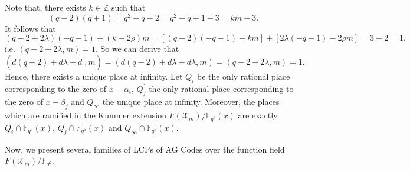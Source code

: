 \documentclass[journal,12pt,onecolumn]{IEEEtran}
\begin{document}
Note that, there exists $k\in\mathbb{Z}$ such that
\[
    (q-2)(q+1) = q^2-q-2 = q^2-q+1 -3 = km -3. 
\]
It follows that
\[
    (q-2+2\lambda)(-q-1) + (k-2\rho)m = [(q-2)(-q-1)+km] + [2\lambda(-q-1)-2\rho m] = 3-2 =1,
\]
i.e. $(q-2+2\lambda,m)=1$. So we can derive that 
\[
    (d(q-2)+d\lambda+d^\prime,m)=(d(q-2)+d\lambda+d\lambda,m) = (q-2+2\lambda,m)=1.
\]
Hence, there exists a unique place at infinity. Let $Q_i$ be the only rational place corresponding to the zero of $x-\alpha_i$, $Q_j^\prime$ the only rational place corresponding to the zero of $x-\beta_j$ and $Q_\infty$ the unique place at infinity. Moreover, the places which are ramified in the Kummer extension $F(\mathcal{X}_m)/\mathbb{F}_{q^6}(x)$ are exactly $Q_i\cap\mathbb{F}_{q^6}(x)$, $Q_j^\prime\cap\mathbb{F}_{q^6}(x)$ and $Q_\infty\cap\mathbb{F}_{q^6}(x)$. 

Now, we present several families of LCPs of AG Codes over the function field $F(\mathcal{X}_m)/\mathbb{F}_{q^6}$. 


\end{document}
